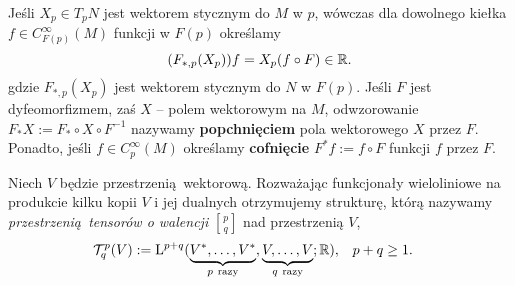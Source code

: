 Jeśli \(X_p\in T_p N\) jest wektorem stycznym do \(M\) w \(p\), wówczas dla dowolnego kiełka \(f\in C_{F(p)}^\infty(M)\) funkcji w \(F(p)\) określamy 
\begin{equation*}
(F_{\ast, p} (X_p))f = X_p(f\circ F) \in \mathbb{R}.
\end{equation*} 
gdzie \(F_{\ast, p} (X_p)\) jest wektorem stycznym do \(N\) w \(F(p)\). Jeśli \(F\) jest dyfeomorfizmem, zaś \(X\) -- polem wektorowym na \(M\), odwzorowanie \(F_\ast X := F_\ast \circ X \circ F^{-1}\) nazywamy \textbf{popchnięciem} pola wektorowego \(X\) przez \(F\). Ponadto, jeśli \(f\in C_p^\infty(M)\) określamy \textbf{cofnięcie} \(F^\ast f := f\circ F\) funkcji \(f\) przez \(F\).


Niech \(V\) będzie przestrzenią wektorową. Rozważając funkcjonały wieloliniowe na produkcie kilku kopii \(V\) i jej dualnych otrzymujemy strukturę, którą nazywamy \emph{przestrzenią tensorów o walencji} \({p \brack q}\) nad przestrzenią \(V\),
\begin{align*}
    \mathcal{T}_q^p(V) := \mathrm{L}^{p+q}(\underbrace{V^\ast, \dots, V^\ast}_{p\ \text{razy}} ,\underbrace{V,\dots, V}_{q\ \text{razy}}; \mathbb{R}) , &\quad p+q\geq 1.
\end{align*}
